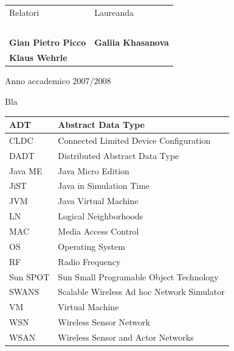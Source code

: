 \documentclass[msc, openright, a4paper]{TNthesis}
\newcommand\B{\rule[-1.7ex]{0pt}{0pt}} %
\newcommand\T{\rule{0pt}{3.1ex}} %
\begin{document}
\begin{preliminary}
\begin{titlepage}
\begin{center}
	        \vspace{1.5cm}
	    \end{center}
	\begin{center}
	    \begin{tabular}{ll}
	        \large{Relatori} & \hspace{5 cm} \large{Laureanda}\\
	        \small{\ } & \small{ }\\
	        \large{\textbf{Gian Pietro Picco}} & \hspace{5 cm}
	        								\large{\textbf{Galiia Khasanova}}\\
	        \large{\textbf{Klaus Wehrle}} & \hspace{5 cm}\\
	    \end{tabular}
	\end{center}
	    \vspace{1.0cm}
	    \begin{center}\begin{large}Anno accademico 2007/2008\end{large}\end{center}
\end{titlepage}

\standarddeclaration

\begin{acknowledgements}
	Bla
\end{acknowledgements}

\begin{acronyms}
	\begin{center}
	\begin{tabular}{| l |p{9cm}|}
	\hline
	ADT \T \B & Abstract Data Type \\
	\hline
	CLDC \T \B & Connected Limited Device Configuration \\
	\hline
	DADT \T \B & Distributed Abstract Data Type \\
	\hline
	Java ME \T \B & Java Micro Edition \\
	\hline
	JiST \T \B & Java in Simulation Time \\
	\hline
	JVM \T \B & Java Virtual Machine \\
	\hline 
	LN \T \B & Logical Neighborhoods \\
	\hline
	MAC \T \B & Media Access Control \\
	\hline
	OS \T \B & Operating System \\
	\hline
	RF \T \B & Radio Frequency \\
	\hline
	Sun SPOT \T \B & Sun Small Programable Object Technology \\
	\hline
	SWANS \T \B & Scalable Wireless Ad hoc Network Simulator \\
	\hline
	VM \T \B & Virtual Machine \\
	\hline
	WSN \T \B & Wireless Sensor Network \\
	\hline
	WSAN \T \B & Wireless Sensor and Actor Networks \\
	\hline
	\end{tabular}
	\end{center}
\end{acronyms}



\end{preliminary}
\end{document}
